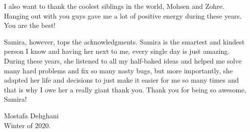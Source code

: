 I also want to thank the coolest siblings in the world, Mohsen and Zohre. Hanging out with you guys gave me a lot of positive energy during these years. You are the best!

Samira, however, tops the acknowledgments. Samira is the smartest and kindest person I know and having her next to me, every single day is just amazing.  During these years, she listened to all my half-baked ideas and helped me solve many hard problems and fix so many nasty bugs, but more importantly, she adapted her life and decisions to just make it easier for me so many times and that is why I owe her a really giant thank you. Thank you for being so awesome, Samira!


\hfill 

Mostafa Dehghani\\
Winter of 2020.
